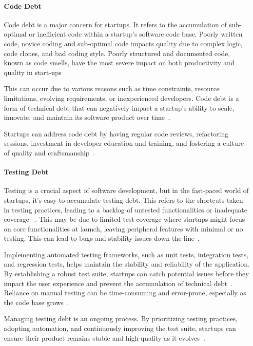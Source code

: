 \paragraph{Code Debt} 
Code debt is a major concern for startups.
It refers to the accumulation of sub-optimal or inefficient code within a startup's software code base.
Poorly written code, novice coding and sub-optimal code impacts quality due to complex logic, code clones, and bad coding style.
Poorly structured and documented code, known as code smells, have the most severe impact on both productivity and quality in start-ups~\cite{Klotins2018/3183519.3183539}

This can occur due to various reasons such as time constraints, resource limitations, evolving requirements, or inexperienced developers.
Code debt is a form of technical debt that can negatively impact a startup's ability to scale, innovate, and maintain its software product over time~\cite{FowlerBottlenecks, Qualityv77:online}.

Startups can address code debt by having regular code reviews, refactoring sessions, investment in developer education and training, and fostering a culture of quality and craftsmanship~\cite{10043622, Acknowle63:online}.

\paragraph{Testing Debt}
Testing is a crucial aspect of software development, but in the fast-paced world of startups, it's easy to accumulate testing debt.
This refers to the shortcuts taken in testing practices, leading to a backlog of untested functionalities or inadequate coverage ~\cite{Howtohan98:online}.
This may be due to limited test coverage where startups might focus on core functionalities at launch, leaving peripheral features with minimal or no testing.
This can lead to bugs and stability issues down the line~\cite{Totalqua26:online}.

Implementing automated testing frameworks, such as unit tests, integration tests, and regression tests, helps maintain the stability and reliability of the application.
By establishing a robust test suite, startups can catch potential issues before they impact the user experience and prevent the accumulation of technical debt~\cite{TheImpac54:online}.
Reliance on manual testing can be time-consuming and error-prone, especially as the code base grows~\cite{Howtohan98:online}.

Managing testing debt is an ongoing process.
By prioritizing testing practices, adopting automation, and continuously improving the test suite, startups can ensure their product remains stable and high-quality as it evolves~\cite{CrowneWhyStartupsFail, 1NewMess49:online}.

